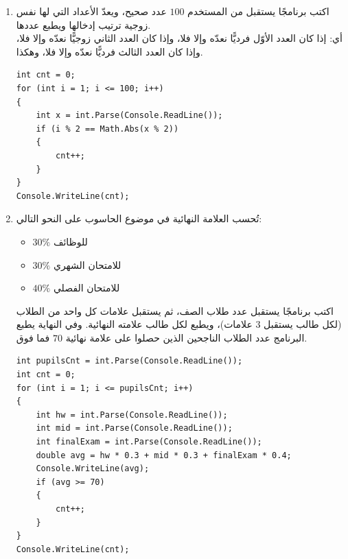 \documentclass[14pt]{extarticle}
\begin{document}
\begin{enumerate}[resume, itemsep=2em]
\item اكتب برنامجًا يستقبل من المستخدم $100$ عدد صحيح، ويعدّ الأعداد التي لها نفس زوجية ترتيب إدخالها ويطبع عددها. \\
أي: إذا كان العدد الأوّل فرديًّا نعدّه وإلا فلا، وإذا كان العدد الثاني زوجيًّا نعدّه وإلا فلا، وإذا كان العدد الثالث فرديًّا نعدّه وإلا فلا، وهكذا.
\ifwithsols
\begin{boxSolution}
\begin{english}
\begin{verbatim}
int cnt = 0;
for (int i = 1; i <= 100; i++)
{
    int x = int.Parse(Console.ReadLine());
    if (i % 2 == Math.Abs(x % 2))
    {
        cnt++;
    }
}
Console.WriteLine(cnt);
\end{verbatim}
\end{english}
\end{boxSolution}
\fi
\filbreak

\item تُحسب العلامة النهائية في موضوع الحاسوب على النحو التالي:
\begin{itemize}[nosep]
    \item $30\%$ للوظائف
    \item $30\%$ للامتحان الشهري
    \item $40\%$ للامتحان الفصلي
\end{itemize}
اكتب برنامجًا يستقبل عدد طلاب الصف، ثم يستقبل علامات كل واحد من الطلاب (لكل طالب يستقبل $3$ علامات)، ويطبع لكل طالب علامته النهائية. وفي النهاية يطبع البرنامج عدد الطلاب الناجحين الذين حصلوا على علامة نهائية $70$ فما فوق.
\ifwithsols
\begin{boxSolution}
\begin{english}
\begin{verbatim}
int pupilsCnt = int.Parse(Console.ReadLine());
int cnt = 0;
for (int i = 1; i <= pupilsCnt; i++)
{
    int hw = int.Parse(Console.ReadLine());
    int mid = int.Parse(Console.ReadLine());
    int finalExam = int.Parse(Console.ReadLine());
    double avg = hw * 0.3 + mid * 0.3 + finalExam * 0.4;
    Console.WriteLine(avg);
    if (avg >= 70)
    {
        cnt++;
    }
}
Console.WriteLine(cnt);
\end{verbatim}
\end{english}
\end{boxSolution}
\fi
\filbreak


\end{enumerate}
\end{document}

